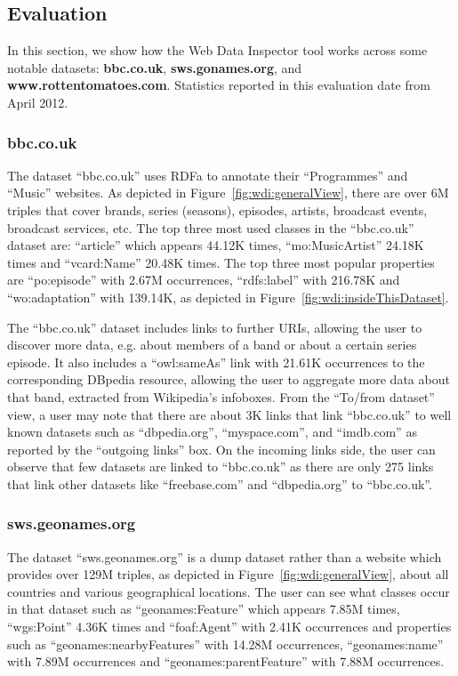 \subsection{Evaluation}

In this section, we show how the Web Data Inspector tool works across some notable datasets: \textbf{bbc.co.uk}, \textbf{sws.gonames.org}, and \textbf{www.rottentomatoes.com}.
Statistics reported in this evaluation date from April 2012.

\subsubsection{bbc.co.uk}

The dataset ``bbc.co.uk'' uses RDFa to annotate their ``Programmes'' and ``Music'' websites. As depicted in Figure~\ref{fig:wdi:generalView}, there are over 6M triples that cover brands, series (seasons), episodes, artists, broadcast events, broadcast services, etc. The top three most used classes in the ``bbc.co.uk'' dataset are: ``article'' which appears 44.12K times, ``mo:MusicArtist'' 24.18K times and ``vcard:Name'' 20.48K times. The top three most popular properties are ``po:episode'' with 2.67M occurrences, ``rdfs:label'' with 216.78K and ``wo:adaptation'' with 139.14K, as depicted in Figure~\ref{fig:wdi:insideThisDataset}.

The ``bbc.co.uk'' dataset includes links to further URIs, allowing the user to discover more data, e.g. about members of a band or about a certain series episode. It also includes a ``owl:sameAs'' link with 21.61K occurrences to the corresponding DBpedia resource, allowing the user to aggregate more data about that band, extracted from Wikipedia's infoboxes. From the ``To/from dataset'' view, a user may note that there are about 3K links that link ``bbc.co.uk'' to well known datasets such as ``dbpedia.org'', ``myspace.com'', and ``imdb.com'' as reported by the ``outgoing links'' box. On the incoming links side, the user can observe that few datasets are linked to ``bbc.co.uk'' as there are only 275 links that link other datasets like ``freebase.com'' and ``dbpedia.org'' to ``bbc.co.uk''.

\subsubsection{sws.geonames.org}

The dataset ``sws.geonames.org'' is a dump dataset rather than a website which provides over 129M triples, as depicted in Figure~\ref{fig:wdi:generalView}, about all countries and various geographical locations. The user can see what classes occur in that dataset such as ``geonames:Feature'' which appears 7.85M times, ``wgs:Point'' 4.36K times and ``foaf:Agent'' with 2.41K occurrences and properties such as ``geonames:nearbyFeatures'' with 14.28M occurrences, ``geonames:name'' with 7.89M occurrences and ``geonames:parentFeature'' with 7.88M occurrences.


